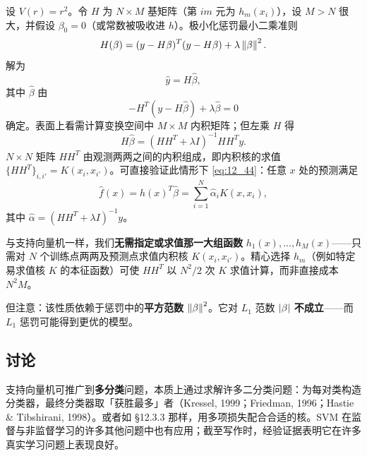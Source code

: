 \begin{example}[平方损失的具体推导]
设 $V(r)=r^2$。令 $H$ 为 $N\times M$ 基矩阵（第 $im$ 元为 $h_m(x_i)$），设 $M>N$ 很大，并假设 $\beta_0=0$（或常数被吸收进 $h$）。极小化惩罚最小二乘准则
\begin{equation}
H(\beta) = (y - H\beta)^T(y - H\beta) + \lambda\left\lVert\beta\right\rVert^2. \label{eq:12_45}
\end{equation}
解为
\begin{equation}
\hat y = H\hat\beta, \label{eq:12_46}
\end{equation}
其中 $\hat\beta$ 由
\begin{equation}
-H^T(y - H\hat\beta) + \lambda\hat\beta = 0 \label{eq:12_47}
\end{equation}
确定。表面上看需计算变换空间中 $M\times M$ 内积矩阵；但左乘 $H$ 得
\begin{equation}
H\hat\beta = (HH^T + \lambda I)^{-1} HH^T y. \label{eq:12_48}
\end{equation}
$N\times N$ 矩阵 $HH^T$ 由观测两两之间的内积组成，即内积核的求值 $\{HH^T\}_{i,i'} = K(x_i,x_{i'})$。可直接验证此情形下 \ref{eq:12_44}：任意 $x$ 处的预测满足
\begin{equation}
\hat f(x) = h(x)^T\hat\beta = \sum_{i=1}^{N}\hat\alpha_i K(x,x_i), \label{eq:12_49}
\end{equation}
其中 $\hat\alpha = (HH^T + \lambda I)^{-1}y$。
\end{example}

\begin{remark}[核技巧的本质与代价]
与支持向量机一样，我们\textbf{无需指定或求值那一大组函数} $h_1(x),\dots,h_M(x)$——只需对 $N$ 个训练点两两及预测点求值内积核 $K(x_i,x_{i'})$。精心选择 $h_m$（例如特定易求值核 $K$ 的本征函数）可使 $HH^T$ 以 $N^2/2$ 次 $K$ 求值计算，而非直接成本 $N^2M$。

但注意：该性质依赖于惩罚中的\textbf{平方范数} $\left\lVert\beta\right\rVert^2$。它对 $L_1$ 范数 $\left\lvert\beta\right\rvert$ \textbf{不成立}——而 $L_1$ 惩罚可能得到更优的模型。
\end{remark}

\subsection{讨论}

支持向量机可推广到\textbf{多分类}问题，本质上通过求解许多二分类问题：为每对类构造分类器，最终分类器取「获胜最多」者（Kressel, 1999；Friedman, 1996；Hastie \& Tibshirani, 1998）。或者如 §12.3.3 那样，用多项损失配合合适的核。SVM 在监督与非监督学习的许多其他问题中也有应用；截至写作时，经验证据表明它在许多真实学习问题上表现良好。

